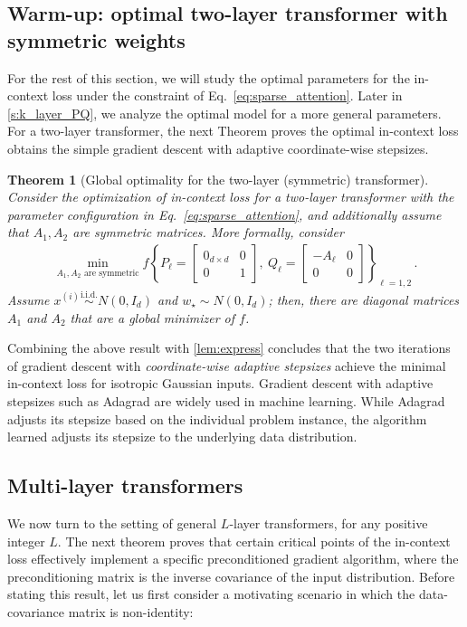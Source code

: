 \documentclass{article}
\newtheorem{theorem}{Theorem}
\newcommand{\wstar}{w_\star}
\newcommand{\tx}[1]{x^{(#1)}}
\begin{document}
\subsection{Warm-up: optimal two-layer transformer with symmetric weights}
\label{s:two_layer}

 For the rest of this section, we will study the optimal parameters for the in-context loss under the constraint of Eq.~\eqref{eq:sparse_attention}. Later in \autoref{s:k_layer_PQ}, we analyze the optimal model for a more general parameters.
For a two-layer transformer, the next Theorem proves the optimal in-context loss obtains the simple gradient descent with adaptive coordinate-wise stepsizes. 


\begin{theorem}[Global optimality for the two-layer (symmetric) transformer]
\label{t:two_layer}
Consider the optimization of in-context loss for a two-layer transformer with the parameter configuration in Eq.~\eqref{eq:sparse_attention}, and additionally assume that $A_1,A_2$ are symmetric matrices. 
More formally, consider
\begin{align}
\min_{A_1,A_2 \text{ are symmetric}} f  \left\{  P_\ell = \begin{bmatrix}
0_{d\times d} & 0 \\ 
0 & 1 
\end{bmatrix},~Q_\ell = \begin{bmatrix}
-A_\ell & 0 \\ 
0 & 0
\end{bmatrix}\right\}_{\ell=1,2}\,.
\end{align}
Assume $\tx{i} \stackrel{\text{i.i.d.}}{\sim}N(0,I_d)$  and $\wstar \sim N(0,I_d)$; then, there are diagonal matrices $A_1$ and $A_2$ that are a global minimizer of $f$.
\end{theorem} 
Combining the above result with \autoref{lem:express} concludes that the two iterations of gradient descent with \emph{coordinate-wise adaptive stepsizes} achieve the minimal in-context loss for isotropic Gaussian inputs. Gradient descent with adaptive stepsizes such as Adagrad \citep{duchi2011adaptive} are widely used in machine learning. While Adagrad adjusts its stepsize based on the individual problem instance, the algorithm learned adjusts its stepsize to the underlying data distribution. 



\subsection{Multi-layer transformers}
\label{s:L_layer_P_0}
We now turn to the setting of general $L$-layer transformers, for any positive integer $L$. The next theorem proves that certain critical points of the in-context loss effectively implement a specific preconditioned gradient algorithm, where the preconditioning matrix is the inverse covariance of the input distribution. Before stating this result, let us first consider a motivating scenario in which the data-covariance matrix is non-identity:
\end{document}
